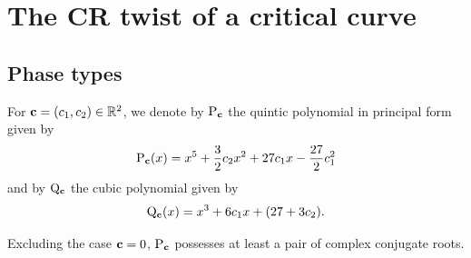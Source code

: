 \documentclass[10pt,a4paper]{amsart}
\numberwithin{equation}{section}
\def\R{\mathbb{R}}
\begin{document}
\section{The CR twist of a critical curve}\label{s:twist}

\subsection{Phase types}%


For ${\bf c}=(c_1,c_2)\in \R^2$, we denote by ${\rm P}_{{\bf c}}$
the quintic polynomial in principal form given by
%
%
\begin{equation*}%
{\rm P}_{{\bf c}}(x)=x^5+\frac{3}{2}c_2x^2+27c_1x-\frac{27}{2}c_1^2
 \end{equation*}
 and by ${\rm Q}_{{\bf c}}$ the cubic polynomial given by
\begin{equation}\label{Cubic_Poly}
{\rm Q}_{{\bf c}}(x)=x^3+6c_1x+(27+3c_2).
 \end{equation}

Excluding the case ${\bf c}=0$, ${\rm P}_{{\bf c}}$ possesses at least a pair of complex conjugate roots.
\end{document}
